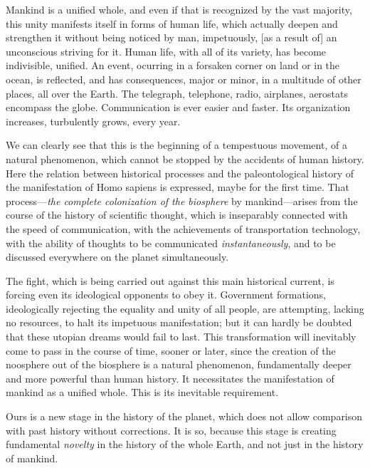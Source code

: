 Mankind is a unified whole, and even if that is recognized by the vast
majority, this unity manifests itself in forms of human life, which actually
deepen and strengthen it without being noticed by man, impetuously, [as a
result of] an unconscious striving for it.  Human life, with all of its
variety, has become indivisible, unified.  An event, ocurring in a forsaken
corner on land or in the ocean, is reflected, and has consequences, major or
minor, in a multitude of other places, all over the Earth.  The telegraph,
telephone, radio, airplanes, aerostats encompass the globe.  Communication is ever easier and
faster.  Its organization increases, turbulently grows, every year.

We can clearly see that this is the beginning of a tempestuous movement, of a
natural phenomenon, which cannot be stopped by the accidents of human history.
Here the relation between historical processes and the paleontological history
of the manifestation of Homo sapiens is expressed, maybe for the first time.
That process---\emph{the complete colonization of the biosphere} by
mankind---arises from the course of the history of scientific thought, which is
inseparably connected with the speed of communication, with the achievements of
transportation technology, with the ability of thoughts to be communicated
\emph{instantaneously}, and to be discussed everywhere on the planet
simultaneously.

The fight, which is being carried out against this main historical current, is
forcing even its ideological opponents to obey it.  Government formations,
ideologically rejecting the equality and unity of all people, are attempting,
lacking no resources, to halt its impetuous manifestation; but it can hardly be
doubted that these utopian dreams would fail to last.  This transformation will
inevitably come to pass in the course of time, sooner or later, since the
creation of the noosphere out of the biosphere is a natural phenomenon,
fundamentally deeper and more powerful than human history.  It necessitates the
manifestation of mankind as a unified whole.  This is its inevitable
requirement.

Ours is a new stage in the history of the planet, which does not allow
comparison with past history without corrections.  It is so, because this stage
is creating fundamental \emph{novelty} in the history of the whole Earth, and
not just in the history of mankind.

